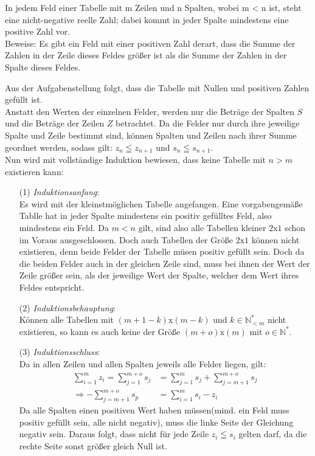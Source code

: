 \documentclass[10pt, a4paper]{amsart}
\makeatletter
\renewenvironment{proof}[1][\proofname]{\par
\pushQED{\qed}%
\normalfont \topsep6\p@\@plus6\p@\relax
\trivlist
\item\relax
{\bfseries#1}\hspace\labelsep\ignorespaces
}{%
\popQED\endtrivlist\@endpefalse
}
\newenvironment{proof thm}[1]{
\begin{proof}[\proofname~(#1)]}{\end{proof}}
\makeatother
\begin{document}
\newpage
\begin{aufgabe}
  In jedem Feld einer Tabelle mit m Zeilen und n Spalten, wobei m < n ist, steht
  eine nicht-negative reelle
  Zahl; dabei kommt in jeder Spalte mindestens eine positive Zahl vor.\\
  Beweise: Es gibt ein Feld mit einer positiven Zahl derart, dass die Summe der
  Zahlen in der Zeile dieses
  Feldes größer ist als die Summe der Zahlen in der Spalte dieses Feldes.\\
\end{aufgabe}
\begin{proof}
  Aus der Aufgabenstellung folgt, dass die Tabelle mit Nullen und positiven
  Zahlen gefüllt ist.\\
  Anstatt den Werten der einzelnen Felder, werden nur die Beträge der Spalten
  $S$ und die Beträge der Zeilen $Z$ betrachtet. Da die Felder nur durch ihre
  jeweilige Spalte und Zeile bestimmt sind, können Spalten und Zeilen nach ihrer
  Summe geordnet werden, sodass gilt: $z_n\leqq z_{n+1}$ und $s_n\leqq s_{n+1}$.\\
  Nun wird mit vollständige Induktion bewiesen, dass keine Tabelle mit $n > m$
  existieren kann:\\
  \begin{itemize}[itemsep=2ex]
  \item[(1)]\emph{Induktionsanfang}:\\
    Es wird mit der kleinstmöglichen Tabelle angefangen. Eine vorgabengemäße
    Tablle hat in jeder Spalte mindestens ein positiv gefülltes Feld, also
    mindestens ein Feld. Da $m<n$ gilt, sind also alle Tabellen kleiner
    $2\text{x}1$ schon im Voraus ausgeschlossen. Doch auch Tabellen der Größe
    $2\text{x}1$ können nicht existieren, denn beide Felder der Tabelle müsen
    positiv gefüllt sein. Doch da die beiden Felder auch in der gleichen Zeile
    sind, muss bei ihnen der Wert der Zeile größer sein, als der jeweilige Wert
    der Spalte, welcher dem Wert ihres Feldes entspricht.
  \item[(2)]\emph{Induktionsbehauptung}:\\
    Können alle Tabellen mit $(m+1-k)\text{x}(m-k)$ und $k∈ℕ^*_{<m}$ nicht
    existieren, so kann es auch keine der Größe $(m+o)\text{x}(m)$ mit $o∈ℕ^*$.
  \item[(3)]\emph{Induktionsschluss}:\\
    Da in allen Zeilen und allen Spalten jeweils alle Felder liegen, gilt:
    \begin{align*}
      \sum_{i=1}^{m}z_i=\sum_{j=1}^{m+o}s_j&=\sum_{j=1}^{m}s_j+\sum_{j=m+1}^{m+o}s_j\\
      \Rightarrow -\sum_{j=m+1}^{m+o}s_p&= \sum_{i=1}^{m}s_i-z_i
    \end{align*}
    Da alle Spalten einen positiven Wert haben müssen(mind. ein Feld muss
    positiv gefüllt sein, alle nicht negativ), muss die linke Seite der
    Gleichung negativ sein. Daraus folgt, dass nicht für jede Zeile $z_i\leqq
    s_i$ gelten
    darf, da die rechte Seite sonst größer gleich Null ist.\\
    

\end{itemize}
\end{proof}
\end{document}
